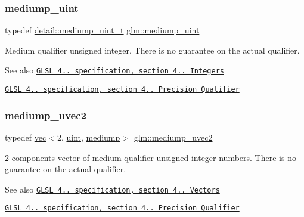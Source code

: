 \subsubsection{\texorpdfstring{mediump\+\_\+uint}{mediump\_uint}}
{\footnotesize\ttfamily typedef \mbox{\hyperlink{namespaceglm_1_1detail_a98f572e92099cc1b5740f1ccf1c80f8d}{detail\+::mediump\+\_\+uint\+\_\+t}} \mbox{\hyperlink{group__core__precision_ga08ae38ad78ade3539fdd1d25052b8c51}{glm\+::mediump\+\_\+uint}}}

Medium qualifier unsigned integer. There is no guarantee on the actual qualifier.

\begin{DoxySeeAlso}{See also}
\href{http://www.opengl.org/registry/doc/GLSLangSpec.4.20.8.pdf}{\tt G\+L\+SL 4.. specification, section 4.. Integers} 

\href{http://www.opengl.org/registry/doc/GLSLangSpec.4.20.8.pdf}{\tt G\+L\+SL 4.. specification, section 4.. Precision Qualifier} 
\end{DoxySeeAlso}
\mbox{\label{group__core__precision_ga35052256be4d47b9cb80114ca043cfaf}} 
\subsubsection{\texorpdfstring{mediump\+\_\+uvec2}{mediump\_uvec2}}
{\footnotesize\ttfamily typedef \mbox{\hyperlink{structglm_1_1vec}{vec}}$<$2, \mbox{\hyperlink{group__core__precision_ga4fd29415871152bfb5abd588334147c8}{uint}}, \mbox{\hyperlink{namespaceglm_a36ed105b07c7746804d7fdc7cc90ff25a6416f3ea0c9025fb21ed50c4d6620482}{mediump}}$>$ \mbox{\hyperlink{group__core__precision_ga35052256be4d47b9cb80114ca043cfaf}{glm\+::mediump\+\_\+uvec2}}}

2 components vector of medium qualifier unsigned integer numbers. There is no guarantee on the actual qualifier.

\begin{DoxySeeAlso}{See also}
\href{http://www.opengl.org/registry/doc/GLSLangSpec.4.20.8.pdf}{\tt G\+L\+SL 4.. specification, section 4.. Vectors} 

\href{http://www.opengl.org/registry/doc/GLSLangSpec.4.20.8.pdf}{\tt G\+L\+SL 4.. specification, section 4.. Precision Qualifier} 
\end{DoxySeeAlso}
\mbox{\label{group__core__precision_ga0eaf34ab9ebc5e2c92cd6d6d5aa272f4}} 
